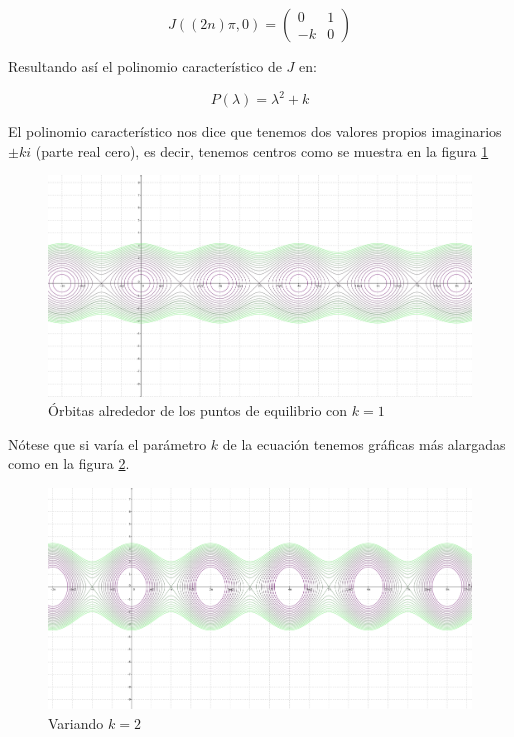 \documentclass[10pt,letterpaper,titlepage]{article}
\begin{document}
\[
	J((2n) \pi,0) = \begin{pmatrix}
		0 & 1\\
		-k & 0
	\end{pmatrix}
\]

Resultando as\'i el polinomio caracter\'istico de $J$ en:

\begin{equation}
	P(\lambda) = \lambda ^{2} + k
\end{equation}

El polinomio caracter\'istico nos dice que tenemos dos valores propios imaginarios $\pm ki$ (parte real cero), es decir, tenemos centros como se muestra en la figura \ref{fig:orbitas}

\begin{figure}
	\includegraphics[width=\textwidth]{plot.png}
	\caption{Órbitas alrededor de los puntos de equilibrio con $k=1$}
	\label{fig:orbitas}
\end{figure}

Nótese que si varía el parámetro $k$ de la ecuación tenemos gráficas más alargadas como en la figura \ref{fig:orbitas_largas}.

\begin{figure}
	\includegraphics[width=\textwidth]{plot2.png}
	\caption{Variando $k=2$}
	\label{fig:orbitas_largas}
\end{figure}
\end{document}
